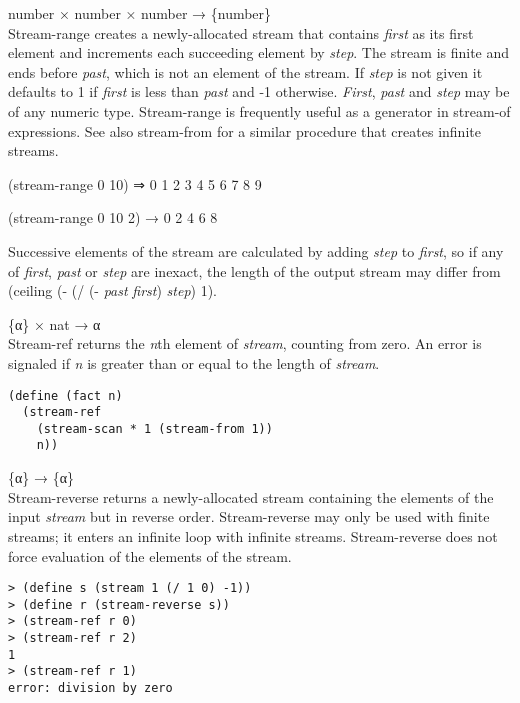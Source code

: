 \begin{entry}{%
  }

  number × number × number → \{number\}\\
  Stream-range creates a newly-allocated stream that contains
  \emph{first} as its first element and increments each succeeding
  element by \emph{step}. The stream is finite and ends before
  \emph{past}, which is not an element of the stream. If \emph{step}
  is not given it defaults to 1 if \emph{first} is less than
  \emph{past} and -1 otherwise.  \emph{First}, \emph{past} and
  \emph{step} may be of any numeric type.  Stream-range is frequently
  useful as a generator in stream-of expressions. See also stream-from
  for a similar procedure that creates infinite streams.

  (stream-range 0 10) ⇒ 0 1 2 3 4 5 6 7 8 9

  (stream-range 0 10 2) → 0 2 4 6 8

  Successive elements of the stream are calculated by adding
  \emph{step} to \emph{first}, so if any of \emph{first}, \emph{past}
  or \emph{step} are inexact, the length of the output stream may
  differ from (ceiling (- (/ (- \emph{past} \emph{first}) \emph{step})
  1).
\end{entry}

\begin{entry}{%
  }

  \{α\} × nat → α\\
  Stream-ref returns the \emph{n}th element of \emph{stream}, counting
  from zero. An error is signaled if \emph{n} is greater than or equal
  to the length of \emph{stream}.

\begin{verbatim}
(define (fact n)
  (stream-ref
    (stream-scan * 1 (stream-from 1))
    n))
\end{verbatim}
\end{entry}

\begin{entry}{%
  }

  \{α\} → \{α\}\\
  Stream-reverse returns a newly-allocated stream containing the
  elements of the input \emph{stream} but in reverse
  order. Stream-reverse may only be used with finite streams; it
  enters an infinite loop with infinite streams. Stream-reverse does
  not force evaluation of the elements of the stream.

\begin{verbatim}
> (define s (stream 1 (/ 1 0) -1))
> (define r (stream-reverse s))
> (stream-ref r 0)
> (stream-ref r 2)
1
> (stream-ref r 1)
error: division by zero
\end{verbatim}
\end{entry}

